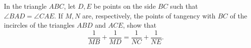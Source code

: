In the triangle $ABC$, let $D, E$ be points on the side $BC$ such that $\angle BAD = \angle CAE$. If $M, N$ are, respectively, the points of tangency with $BC$ of the incircles of the triangles $ABD$ and $ACE$, show that
\[ \frac{1}{MB} + \frac{1}{MD} = \frac{1}{NC} + \frac{1}{NE}. \]
